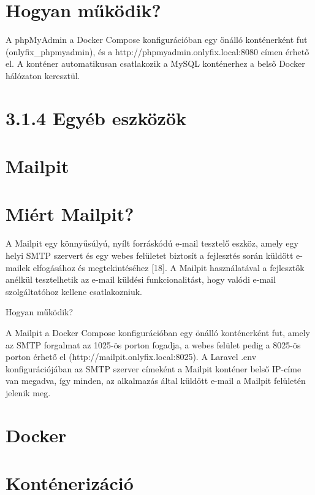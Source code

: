 \section{Hogyan működik?}\label{hogyan-mux171kuxf6dik-3}

A phpMyAdmin a Docker Compose konfigurációban egy önálló konténerként fut (onlyfix\_phpmyadmin), és a http://phpmyadmin.onlyfix.local:8080 címen érhető el. A konténer automatikusan csatlakozik a MySQL konténerhez a belső Docker hálózaton keresztül.

\section{3.1.4 Egyéb eszközök}\label{egyuxe9b-eszkuxf6zuxf6k}

\section{Mailpit}\label{mailpit}

\section{Miért Mailpit?}\label{miuxe9rt-mailpit}

A Mailpit egy könnyűsúlyú, nyílt forráskódú e-mail tesztelő eszköz, amely egy helyi SMTP szervert és egy webes felületet biztosít a fejlesztés során küldött e-mailek elfogásához és megtekintéséhez {[}18{]}. A Mailpit használatával a fejlesztők anélkül tesztelhetik az e-mail küldési funkcionalitást, hogy valódi e-mail szolgáltatóhoz kellene csatlakozniuk.

Hogyan működik?

A Mailpit a Docker Compose konfigurációban egy önálló konténerként fut, amely az SMTP forgalmat az 1025-ös porton fogadja, a webes felület pedig a 8025-ös porton érhető el (http://mailpit.onlyfix.local:8025). A Laravel .env konfigurációjában az SMTP szerver címeként a Mailpit konténer belső IP-címe van megadva, így minden, az alkalmazás által küldött e-mail a Mailpit felületén jelenik meg.

\section{Docker}\label{docker}

\section{Konténerizáció}\label{kontuxe9nerizuxe1ciuxf3}

